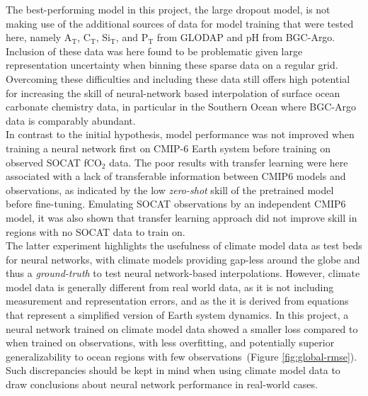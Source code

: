 \documentclass{article}
\begin{document}
	The best-performing model in this project, the large dropout model, is not making use of the additional sources of data for model training that were tested here, namely A$_\text{T}$, C$_\text{T}$, Si$_\text{T}$, and P$_\text{T}$ from GLODAP and pH from BGC-Argo. Inclusion of these data was here found to be problematic given large representation uncertainty when binning these sparse data on a regular grid. Overcoming these difficulties and including these data still offers high potential for increasing the skill of neural-network based interpolation of surface ocean carbonate chemistry data, in particular in the Southern Ocean where BGC-Argo data is comparably abundant. \\
	
	In contrast to the initial hypothesis, model performance was not improved when training a neural network first on CMIP-6 Earth system before training on observed SOCAT fCO$_2$ data. The poor results with transfer learning were here associated with a lack of transferable information between CMIP6 models and observations, as indicated by the low \textit{zero-shot} skill of the pretrained model before fine-tuning. Emulating SOCAT observations by an independent CMIP6 model, it was also shown that transfer learning approach did not improve skill in regions with no SOCAT data to train on. \\
	
	The latter experiment highlights the usefulness of climate model data as test beds for neural networks, with climate models providing gap-less around the globe and thus a \textit{ground-truth} to test neural network-based interpolations. However, climate model data is generally different from real world data, as it is not including measurement and representation errors, and as the it is derived from equations that represent a simplified version of Earth system dynamics. In this project, a neural network trained on climate model data showed a smaller loss compared to when trained on observations, with less overfitting, and potentially superior generalizability to ocean regions with few observations~(Figure \ref{fig:global-rmse}). Such discrepancies should be kept in mind when using climate model data to draw conclusions about neural network performance in real-world cases.  
	\medskip
	
	
	
\end{document}
